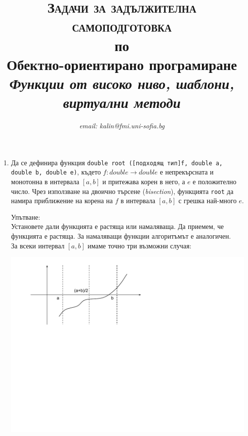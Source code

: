 \documentclass[12pt,a4paper]{article}
\author{\textit{email: kalin@fmi.uni-sofia.bg}}
\title{\textsc{Задачи за задължителна самоподготовка} \\
по \\
Обектно-ориентирано програмиране\\
\textit{Функции от високо ниво, шаблони, виртуални методи}}
\newcommand{\code}[1]{\texttt{#1}}
\begin{document}
\maketitle


\begin{enumerate}


	\item Да се дефинира функция \code{double root ([подходящ тип]f, double a, double b, double e)}, където
	 $f:double \rightarrow double$ е непрекърсната и монотонна в интервала $[a,b]$ и притежава корен в него, а $e$ е положително число. Чрез използване на двоично търсене (\textit{bisection}), функцията \code{root} да намира приближение на корена на $f$ в интервала $[a,b]$ с грешка най-много $e$.

	\begin{mdframed}[hidealllines=true,backgroundcolor=gray!20]
	Упътване:\\

	Установете дали функцията е растяща или намаляваща. Да приемем, че функцията е растяща. За намаляващи функции алгоритъмът е аналогичен. \\

	За всеки интервал $[a,b]$ имаме точно три възможни случая:\\

	\begin{center}
	\includegraphics[width=14.0cm]{images/function}
	\end{center}

	\vspace{-180px}



\end{mdframed}
\end{enumerate}
\end{document}
